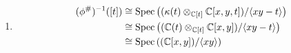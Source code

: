 \documentclass[Notebook.tex]{subfiles}
\begin{document}
\begin{solution}
\begin{enumerate}
\begin{enumerate}
            \item \begin{align*}
                (\phi^{\#})^{-1}([t]) &\cong \operatorname{Spec}\left((\kappa(t) \otimes_{\mathbb C[t]} \mathbb C[x,y,t])/\langle xy - t \rangle\right) \\
                &\cong \operatorname{Spec}\left((\mathbb C(t) \otimes_{\mathbb C[t]} \mathbb C[x,y])/\langle xy - t \rangle\right) \\
                &\cong \operatorname{Spec}\left((\mathbb C[x,y])/\langle xy \rangle\right) \\
            \end{align*}
        \end{enumerate}
    \end{enumerate}
\end{solution}
\end{document}
